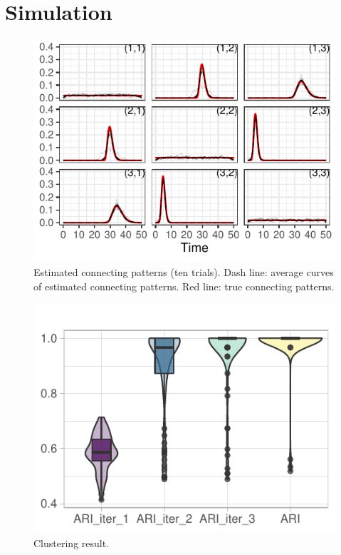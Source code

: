 
\section{Simulation} \label{sec:simulation}


\begin{figure}[H]
\includegraphics[width=\textwidth]{../simulation/plots/conn_pattern}
\caption{ Estimated connecting patterns (ten trials). Dash line: average curves of estimated connecting patterns. Red line: true connecting patterns.}
\end{figure}



\begin{figure}[H]
\includegraphics[width=.8\textwidth]{../simulation/plots/violin_cpmr}
\caption{Clustering result.}
\end{figure}


